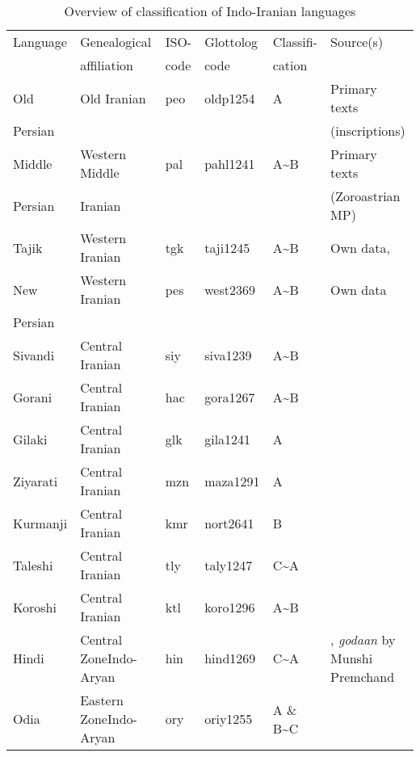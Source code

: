\documentclass[output=paper,colorlinks,citecolor=brown]{langscibook}
\begin{document}
\begin{table}\begin{small}
\caption{Overview of classification of Indo-Iranian languages}
\label{tab:ieur-class-Indo-Iranian}
\begin{tabularx}{\textwidth}{@{} l p{23mm} l l l Q @{}}
\lsptoprule
{Language} & {Genealogical} & {ISO-}&
{Glottolog} & {Classifi-} & {Source(s)}\\
&{affiliation} &{code} &{code}&{cation} \\
\midrule
Old & Old Iranian & peo & oldp1254 & A & Primary texts \\
Persian & & & & &(inscriptions)\\
\tablevspace
Middle & Western Middle & pal & pahl1241 & A{\textasciitilde}B & Primary texts \\
Persian & Iranian & & & &(Zoroastrian MP)\\
\tablevspace
Tajik & Western Iranian & tgk & taji1245 & A{\textasciitilde}B & Own data, \citealt{Perry2005}\\
\tablevspace
New & Western Iranian & pes & west2369 & A{\textasciitilde}B & Own data\\
Persian \\
\tablevspace
Sivandi & Central Iranian & siy & siva1239 & A{\textasciitilde}B & \citealt{Lecoq1979}\\
\tablevspace
Gorani & Central Iranian & hac & gora1267 & A{\textasciitilde}B &
\citealt{MahmoudveysiBailey2012}\\
\tablevspace
Gilaki & Central Iranian & glk & gila1241 & A &
\citealt{RastorguevaKerimova2012} \\
\tablevspace
Ziyarati & Central Iranian & mzn & maza1291 & A & \citealt{ShokriJahani2013} \\
\tablevspace
Kurmanji & Central Iranian & kmr & nort2641 & B & \citealt{Thackston2006} \\
\tablevspace
Taleshi & Central Iranian & tly & taly1247 & C{\textasciitilde}A & \citealt{Paul2011}\\
\tablevspace
Koroshi & Central Iranian & ktl & koro1296 & A{\textasciitilde}B &
\citealt{NourzaeiJahani2015} \\
\tablevspace
Hindi & Central Zone\newline Indo-Aryan & hin & hind1269 & C{\textasciitilde}A & \citealt{Bashir2006}, \textit{godaan} by Munshi Premchand\\
\tablevspace
Odia & Eastern Zone\newline Indo-Aryan & ory & oriy1255 & A \& B{\textasciitilde}C & \citealt{NeukomPatnaik2003} \\

\end{tabularx}
\end{small}
\end{table}
\end{document}
